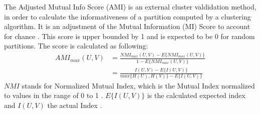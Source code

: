 The Adjusted Mutual Info Score (AMI) is an external cluster valdidation method, in order to calculate the informativeness of a partition computed by a clustering algorithm. It is an adjustment of the Mutual Information (MI) Score to account for chance \cite{scikitlearn}. This score is upper bounded by 1 and is expected to be 0 for random partitions. The score is calculated as following: \cite{ari_form}
\begin{align}
    AMI_{max}(U,V) &= \frac{NMI_{max}(U,V)-E\{NMI_{max}(U,V)\}}{1-E\{NMI_{max}(U,V)\}}\\ &= \frac{I(U,V)-E\{I(U,V)\}}{max\{H(U), H(V)\}-E\{I(U,V)\}}
\end{align}
$NMI$ stands for Normalized Mutual Index, which is the Mutual Index normalized to values in the range of 0 to 1 \cite{scikitlearn}. $E\{I(U,V)\}$ is the calculated expected index and $I(U,V)$ the actual Index \cite{ari_form}.